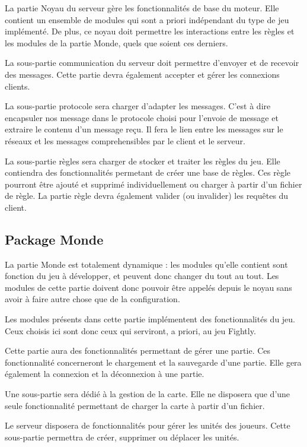 \documentclass[a4paper,10pt]{report}
\begin{document}
	La partie Noyau du serveur gère les fonctionnalités de base du moteur. Elle contient un ensemble de modules qui sont a priori indépendant du type de jeu implémenté. De plus, ce noyau doit permettre les interactions entre les règles et les modules de la partie Monde, quels que soient ces derniers. 

	La sous-partie communication du serveur doit permettre d'envoyer et de recevoir des messages. Cette partie devra également accepter et gérer les connexions clients.

	La sous-partie protocole sera charger d'adapter les messages. C'est à dire encapsuler nos message dans le protocole choisi pour l'envoie de message et extraire le contenu d'un message reçu. Il fera le lien entre les messages sur le réseaux et les messages comprehensibles par le client et le serveur.

	La sous-partie règles sera charger de stocker et traiter les règles du jeu. Elle contiendra des fonctionnalités permetant de créer une base de règles. Ces règle pourront être ajouté et supprimé individuellement ou charger à partir d'un fichier de règle. La partie règle devra également valider (ou invalider) les requêtes du client.

      \subsection{Package Monde}

	La partie Monde est totalement dynamique : les modules qu'elle contient sont fonction du jeu à développer, et peuvent donc changer du tout au tout. Les modules de cette partie doivent donc pouvoir être appelés depuis le noyau sans avoir à faire autre chose que de la configuration. 

	Les modules présents dans cette partie implémentent des fonctionnalités du jeu. Ceux choisis ici sont donc ceux qui serviront, a priori, au jeu Fightly.

	Cette partie aura des fonctionnalités permettant de gérer une partie. Ces fonctionnalité concerneront le chargement et la sauvegarde d'une partie. Elle gera également la connexion et la déconnexion à une partie.

	Une sous-partie sera dédié à la gestion de la carte. Elle ne disposera que d'une seule fonctionnalité permettant de charger la carte à partir d'un fichier.

	Le serveur disposera de fonctionnalités pour gérer les unités des joueurs. Cette sous-partie permettra de créer, supprimer ou déplacer les unités.
\end{document}

